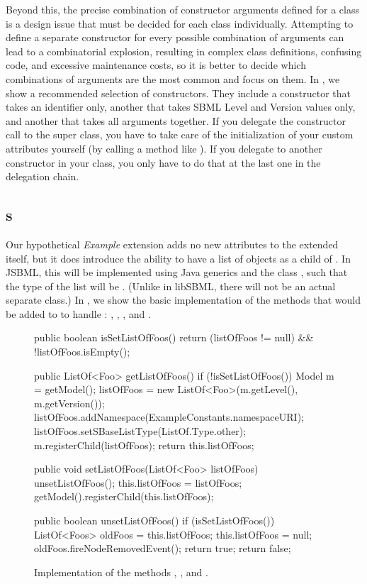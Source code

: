 Beyond this, the precise combination of constructor arguments defined for a
class is a design issue that must be decided for each class individually.
Attempting to define a separate constructor for every possible combination
of arguments can lead to a combinatorial explosion, resulting in complex
class definitions, confusing code, and excessive maintenance costs, so it
is better to decide which combinations of arguments are the most common and
focus on them.  In , we show a
recommended selection of constructors.  They include a constructor that
takes an identifier only, another that takes SBML Level and Version values
only, and another that takes all arguments together.  If you delegate the
constructor call to the super class, you have to take care of the
initialization of your custom attributes yourself (by calling a method like
).  If you delegate to another constructor in your
class, you only have to do that at the last one in the delegation chain.


\subsection{s}
\label{sec:listofs}

Our hypothetical \emph{Example} extension adds no new attributes to the
extended \Model itself, but it does introduce the ability to have a list of
 objects as a child of \Model.  In JSBML, this will be
implemented using Java generics and the class , such that the
type of the list will be .  (Unlike in libSBML, there
will not be an actual separate  class.)  In
, we show the basic implementation
of the methods that would be added to \Model to handle
: , ,
, and .

\begin{figure}[b]
  \begin{example}
public boolean isSetListOfFoos() {
  return (listOfFoos != null) && !listOfFoos.isEmpty();
}

public ListOf<Foo> getListOfFoos() {
  if (!isSetListOfFoos()) {
    Model m = getModel();
    listOfFoos = new ListOf<Foo>(m.getLevel(), m.getVersion());
    listOfFoos.addNamespace(ExampleConstants.namespaceURI);
    listOfFoos.setSBaseListType(ListOf.Type.other);
    m.registerChild(listOfFoos);
  }
  return this.listOfFoos;
}

public void setListOfFoos(ListOf<Foo> listOfFoos) {
  unsetListOfFoos();
  this.listOfFoos = listOfFoos;
  getModel().registerChild(this.listOfFoos);
}

public boolean unsetListOfFoos() {
  if (isSetListOfFoos()) {
    ListOf<Foos> oldFoos = this.listOfFoos;
    this.listOfFoos = null;
    oldFoos.fireNodeRemovedEvent();
    return true;
  }
  return false;
}\end{example}
  \caption{Implementation of the methods ,
    , and .}
  \label{lst:ModelExtListOfFoosBasic}
\end{figure}


